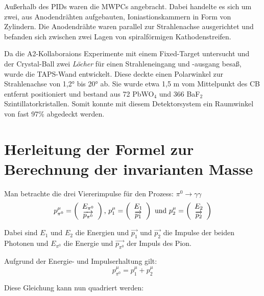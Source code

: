 \documentclass[a4paper,11pt,oneside,final,german,openbib,pdftex]{scrbook}
\begin{document}
{Au{\ss}erhalb des PIDs waren die MWPCs angebracht. Dabei handelte es sich um zwei, aus Anodendr\"ahten aufgebauten, Ioniastionskammern in Form von Zylindern. Die Anodendr\"ahte waren parallel zur Strahlenachse ausgerichtet und befanden sich zwischen zwei Lagen von spiralf\"ormigen Kathodenstreifen. 

Da die A2-Kollaboraions Experimente mit einem Fixed-Target untersucht und der Crystal-Ball zwei \textit{L\"ocher} f\"ur einen Strahleneingang und -ausgang besa{\ss}, wurde die TAPS-Wand entwickelt. Diese deckte einen Polarwinkel zur Strahlenachse von 1,2° bis 20° ab. Sie wurde etwa 1,5 m vom Mittelpunkt des CB entfernt positioniert und bestand aus 72 PbWO$_4$ und 366 BaF$_2$ Szintillatorkristallen. Somit konnte mit diesem Detektorsystem ein Raumwinkel von fast 97\% abgedeckt werden.

\chapter{Herleitung der Formel zur Berechnung der invarianten Masse}

Man betrachte die drei Viererimpulse f\"ur den Prozess: $\pi^0\rightarrow \gamma\gamma $
\begin{equation}
p_{\pi^0}^{\mu}=\left(\begin{array}{c}E_{\pi^0}\\\overrightarrow{p_{\pi^0}}\end{array}\right) \textnormal{,  }
p_{1}^{\mu}=\left(\begin{array}{c}E_{1}\\\overrightarrow{p_{1}}\end{array}\right) \textnormal{ und  } p_{2}^{\mu}=\left(\begin{array}{c}E_{2}\\\overrightarrow{p_{2}}\end{array}\right)
\end{equation}

Dabei sind $E_{1}$ und $E_{2}$ die Energien und $\overrightarrow{p_{1}}$ und $\overrightarrow{p_{2}}$ die Impulse der beiden Photonen und $E_{\pi^0}$ die Energie und $\overrightarrow{p_{\pi^0}}$ der Impuls des Pion.

Aufgrund der Energie- und Impulserhaltung gilt:
\begin{equation}
p^{\mu}_{\pi^0} = p^{\mu}_1 + p^{\mu}_2
\end{equation}

Diese Gleichung kann nun quadriert werden:

}
\end{document}
